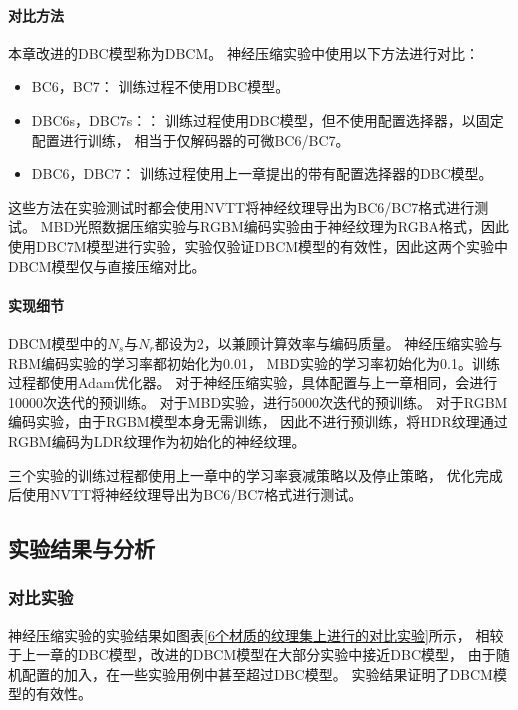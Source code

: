 \paragraph{对比方法}

本章改进的DBC模型称为DBCM。
神经压缩实验中使用以下方法进行对比：

\begin{itemize}
    \item BC6，BC7： 训练过程不使用DBC模型。
    \item DBC6s，DBC7s：： 训练过程使用DBC模型，但不使用配置选择器，以固定配置进行训练，
    相当于仅解码器的可微BC6/BC7。
    \item DBC6，DBC7： 训练过程使用上一章提出的带有配置选择器的DBC模型。    
\end{itemize}

这些方法在实验测试时都会使用NVTT将神经纹理导出为BC6/BC7格式进行测试。
MBD光照数据压缩实验与RGBM编码实验由于神经纹理为RGBA格式，因此
使用DBC7M模型进行实验，实验仅验证DBCM模型的有效性，因此这两个实验中
DBCM模型仅与直接压缩对比。

\paragraph{实现细节}

DBCM模型中的$N_s$与$N_r$都设为2，以兼顾计算效率与编码质量。
神经压缩实验与RBM编码实验的学习率都初始化为0.01，
MBD实验的学习率初始化为0.1。训练过程都使用Adam优化器。
对于神经压缩实验，具体配置与上一章相同，会进行10000次迭代的预训练。
对于MBD实验，进行5000次迭代的预训练。
对于RGBM编码实验，由于RGBM模型本身无需训练，
因此不进行预训练，将HDR纹理通过RGBM编码为LDR纹理作为初始化的神经纹理。

三个实验的训练过程都使用上一章中的学习率衰减策略以及停止策略，
优化完成后使用NVTT将神经纹理导出为BC6/BC7格式进行测试。

\subsection{实验结果与分析}

\subsubsection{对比实验}
\label{4:对比实验}

神经压缩实验的实验结果如图表\ref{6个材质的纹理集上进行的对比实验}所示，
相较于上一章的DBC模型，改进的DBCM模型在大部分实验中接近DBC模型，
由于随机配置的加入，在一些实验用例中甚至超过DBC模型。
实验结果证明了DBCM模型的有效性。

